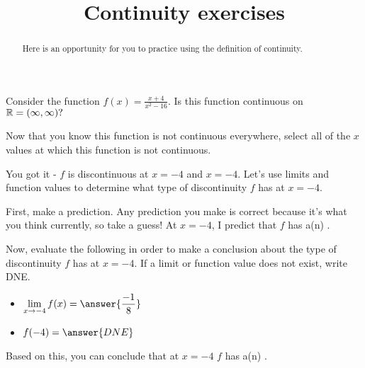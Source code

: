 \documentclass[handout]{ximera}
\title{Continuity exercises}
\begin{document}
\begin{abstract}
Here is an opportunity for you to practice using the definition of continuity. 
\end{abstract}
\maketitle

\begin{exercise}

Consider the function $f(x) = \frac{x+4}{x^2-16}.$  Is this function continuous on $\mathbb R = (\infty, \infty)?$  

\begin{multipleChoice}
\end{multipleChoice}

\begin{exercise}
Now that you know this function is not continuous everywhere, select all of the $x$ values at which this function is not continuous. 

\begin{selectAll}
\end{selectAll}

\begin{exercise}

You got it - $f$ is discontinuous at $x=-4$ and $x=-4$.  Let's use limits and function values to determine what type of discontinuity $f$ has at $x=-4$.

First, make a prediction.  Any prediction you make is correct because it's what you think currently, so take a guess!  At $x=-4$, I predict that $f$ has a(n) .  

Now, evaluate the following in order to make a conclusion about the type of discontinuity $f$ has at $x=-4$.  If a limit or function value does not exist, write DNE.

\begin{itemize}

\item $\displaystyle\lim_{x \to -4} f(x) = \answer{\frac{-1}{8}}$

\item $f(-4) = \answer{DNE}$

\end{itemize}

Based on this, you can conclude that at $x=-4$ $f$ has a(n) .  

\end{exercise}
\end{exercise}
\end{exercise}
\end{document}
